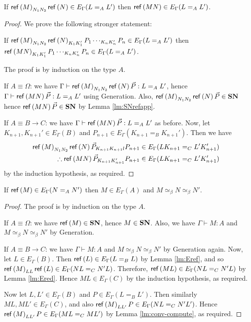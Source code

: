 \begin{lm}
\label{lm:Ered}
If $\mathsf{ref} \left( {M} \right)_{N_1 N_2} \mathsf{ref} \left( {N} \right) \in E_\Gamma(L =_A L')$ then $\mathsf{ref} \left( {MN} \right) \in E_\Gamma(L =_A L')$.
\end{lm}

\begin{proof}
We prove the following stronger statement:

If $\mathsf{ref} \left( {M} \right)_{N_1 N_2} \mathsf{ref} \left( {N} \right)_{K_1 K_1'} P_1 \cdots_{K_n K_n'} P_n \in E_\Gamma(L =_A L')$ then \\
$\mathsf{ref} \left( {MN} \right)_{K_1 K_1'} P_1 \cdots_{K_n K_n'} P_n \in E_\Gamma(L =_A L')$.

The proof is by induction on the type $A$.

If $A \equiv \Omega$: we have $\Gamma \vdash \mathsf{ref} \left( {M} \right)_{N_1 N_2} \mathsf{ref} \left( {N} \right) \vec{P} : L =_A L'$, hence $\Gamma \vdash \mathsf{ref} \left( {MN} \right) \vec{P} : L =_A L'$
using Generation.  Also, $\mathsf{ref} \left( {M} \right)_{N_1 N_2} \mathsf{ref} \left( {N} \right) \vec{P} \in \mathbf{SN}$ hence $\mathsf{ref} \left( {MN} \right) \vec{P} \in \mathbf{SN}$ by Lemma \ref{lm:SNrefapp}.

If $A \equiv B \rightarrow C$: we have $\Gamma \vdash \mathsf{ref} \left( {MN} \right) \vec{P} : L =_A L'$ as before.  Now, let $K_{n+1}, K_{n+1}' \in E_\Gamma(B)$
and $P_{n+1} \in E_\Gamma(K_{n+1} =_B K_{n+1}')$.  Then we have
\begin{align*}
\mathsf{ref} \left( {M} \right)_{N_1 N_2} \mathsf{ref} \left( {N} \right) \vec{P}_{K_{n+1} K_{n+1}l} P_{n+1} & \in E_\Gamma(LK_{n+1} =_C L'K_{n+1}') \\
\therefore \mathsf{ref} \left( {MN} \right) \vec{P}_{K_{n+1} K_{n+1}'} P_{n+1} & \in E_\Gamma(LK_{n+1} =_C L'K_{n+1}')
\end{align*}
by the induction hypothesis, as required.
\end{proof}

\begin{lm}
\label{lm:Egen}
If $\mathsf{ref} \left( {M} \right) \in E_\Gamma(N =_A N')$ then $M \in E_\Gamma(A)$ and $M \simeq_\beta N \simeq_\beta N'$.
\end{lm}

\begin{proof}
The proof is by induction on the type $A$.

If $A \equiv \Omega$: we have $\mathsf{ref} \left( {M} \right) \in \mathbf{SN}$, hence $M \in \mathbf{SN}$.  Also, we have $\Gamma \vdash M : A$ and $M \simeq_\beta N \simeq_\beta N'$
by Generation.

If $A \equiv B \rightarrow C$: we have $\Gamma \vdash M : A$ and $M \simeq_\beta N \simeq_\beta N'$ by Generation again.  Now, let $L \in E_\Gamma(B)$.
Then $\mathsf{ref} \left( {L} \right) \in E_\Gamma(L =_B L)$ by Lemma \ref{lm:Eref}, and so $\mathsf{ref} \left( {M} \right)_{LL} \mathsf{ref} \left( {L} \right) \in E_\Gamma(NL =_C N'L)$.  Therefore,
$\mathsf{ref} \left( {ML} \right) \in E_\Gamma(NL =_C N'L)$ by Lemma \ref{lm:Ered}.  Hence $ML \in E_\Gamma(C)$ by the induction hypothesis, as required.

Now let $L, L' \in E_\Gamma(B)$ and $P \in E_\Gamma(L =_B L')$.  Then similarly $ML, ML' \in E_\Gamma(C)$, and also $\mathsf{ref} \left( {M} \right)_{L L'} P \in E_\Gamma(NL =_C N'L')$.  Hence $\mathsf{ref} \left( {M} \right)_{L L'} P \in E_\Gamma(ML =_C ML')$
by Lemma \ref{lm:conv-compute}, as required.
\end{proof}

